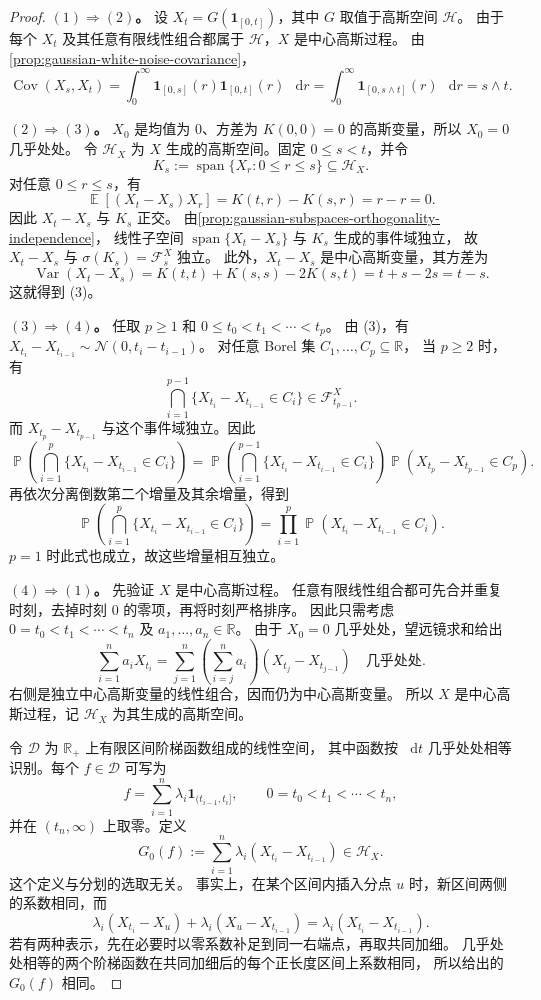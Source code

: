 \documentclass[UTF8,11pt,a4paper,oneside,fontset=fandol]{ctexrep}
\numberwithin{equation}{section}
\theoremstyle{plain}
\theoremstyle{definition}
\theoremstyle{remark}
\newcommand{\R}{\mathbb{R}}
\newcommand{\F}{\mathcal{F}}
\newcommand{\Hcal}{\mathcal{H}}
\DeclareMathOperator{\Prob}{\mathbb{P}}
\DeclareMathOperator{\E}{\mathbb{E}}
\DeclareMathOperator{\Var}{Var}
\DeclareMathOperator{\Cov}{Cov}
\newcommand{\ind}[1]{\mathbf{1}_{#1}}
\newcommand{\dd}{\mathop{}\!\mathrm{d}}
\begin{document}
\begin{proof}
\textbf{$(1)\Rightarrow(2)$。}
设 $X_t=G(\ind{[0,t]})$，其中 $G$ 取值于高斯空间 $\Hcal$。
由于每个 $X_t$ 及其任意有限线性组合都属于 $\Hcal$，$X$ 是中心高斯过程。
由\cref{prop:gaussian-white-noise-covariance}，
\[
  \Cov(X_s,X_t)
  =\int_0^\infty\ind{[0,s]}(r)\ind{[0,t]}(r)\,\dd r
  =\int_0^\infty\ind{[0,s\wedge t]}(r)\,\dd r
  =s\wedge t.
\]

\textbf{$(2)\Rightarrow(3)$。}
$X_0$ 是均值为 $0$、方差为 $K(0,0)=0$ 的高斯变量，所以 $X_0=0$ 几乎处处。
令 $\Hcal_X$ 为 $X$ 生成的高斯空间。固定 $0\le s<t$，并令
\[
  K_s:=\operatorname{span}\{X_r:0\le r\le s\}\subseteq\Hcal_X.
\]
对任意 $0\le r\le s$，有
\[
  \E[(X_t-X_s)X_r]=K(t,r)-K(s,r)=r-r=0.
\]
因此 $X_t-X_s$ 与 $K_s$ 正交。
由\cref{prop:gaussian-subspaces-orthogonality-independence}，
线性子空间 $\operatorname{span}\{X_t-X_s\}$ 与 $K_s$ 生成的事件域独立，
故 $X_t-X_s$ 与 $\sigma(K_s)=\F_s^X$ 独立。
此外，$X_t-X_s$ 是中心高斯变量，其方差为
\[
  \Var(X_t-X_s)=K(t,t)+K(s,s)-2K(s,t)=t+s-2s=t-s.
\]
这就得到 (3)。

\textbf{$(3)\Rightarrow(4)$。}
任取 $p\ge1$ 和 $0\le t_0<t_1<\cdots<t_p$。
由 (3)，有 $X_{t_i}-X_{t_{i-1}}\sim\mathcal{N}(0,t_i-t_{i-1})$。
对任意 Borel 集 $C_1,\ldots,C_p\subseteq\R$，
当 $p\ge2$ 时，有 
\[\bigcap_{i=1}^{p-1}\{X_{t_i}-X_{t_{i-1}}\in C_i\}\in\F_{t_{p-1}}^X.\]
而 $X_{t_p}-X_{t_{p-1}}$ 与这个事件域独立。因此
\[
  \Prob\!\left(\bigcap_{i=1}^{p}\{X_{t_i}-X_{t_{i-1}}\in C_i\}\right)
  =\Prob\!\left(\bigcap_{i=1}^{p-1}\{X_{t_i}-X_{t_{i-1}}\in C_i\}\right)
    \Prob(X_{t_p}-X_{t_{p-1}}\in C_p).
\]
再依次分离倒数第二个增量及其余增量，得到
\[
  \Prob\!\left(\bigcap_{i=1}^{p}\{X_{t_i}-X_{t_{i-1}}\in C_i\}\right)
  =\prod_{i=1}^{p}\Prob(X_{t_i}-X_{t_{i-1}}\in C_i).
\]
$p=1$ 时此式也成立，故这些增量相互独立。

\textbf{$(4)\Rightarrow(1)$。}
先验证 $X$ 是中心高斯过程。
任意有限线性组合都可先合并重复时刻，去掉时刻 $0$ 的零项，再将时刻严格排序。
因此只需考虑 $0=t_0<t_1<\cdots<t_n$ 及 $a_1,\ldots,a_n\in\R$。
由于 $X_0=0$ 几乎处处，望远镜求和给出
\[
  \sum_{i=1}^{n}a_iX_{t_i}
  =\sum_{j=1}^{n}\left(\sum_{i=j}^{n}a_i\right)
       (X_{t_j}-X_{t_{j-1}})
  \quad\text{几乎处处}.
\]
右侧是独立中心高斯变量的线性组合，因而仍为中心高斯变量。
所以 $X$ 是中心高斯过程，记 $\Hcal_X$ 为其生成的高斯空间。

令 $\mathcal{D}$ 为 $\R_+$ 上有限区间阶梯函数组成的线性空间，
其中函数按 $\dd t$ 几乎处处相等识别。每个 $f\in\mathcal{D}$ 可写为
\[
  f=\sum_{i=1}^{n}\lambda_i\ind{(t_{i-1},t_i]},
  \qquad 0=t_0<t_1<\cdots<t_n,
\]
并在 $(t_n,\infty)$ 上取零。定义
\[
  G_0(f):=\sum_{i=1}^{n}\lambda_i(X_{t_i}-X_{t_{i-1}})\in\Hcal_X.
\]
这个定义与分划的选取无关。
事实上，在某个区间内插入分点 $u$ 时，新区间两侧的系数相同，而
\[
  \lambda_i(X_{t_i}-X_u)+\lambda_i(X_u-X_{t_{i-1}})
  =\lambda_i(X_{t_i}-X_{t_{i-1}}).
\]
若有两种表示，先在必要时以零系数补足到同一右端点，再取共同加细。
几乎处处相等的两个阶梯函数在共同加细后的每个正长度区间上系数相同，
所以给出的 $G_0(f)$ 相同。


\end{proof}
\end{document}
